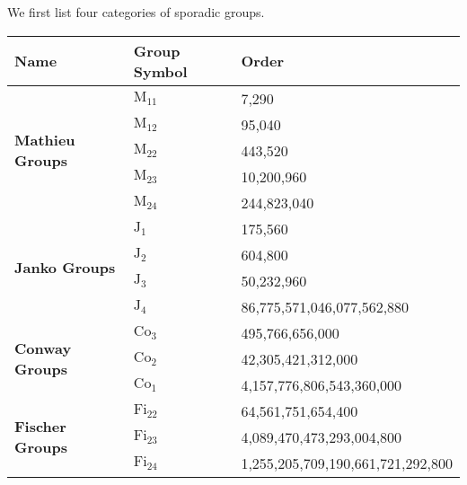 We first list four categories of sporadic groups.
\begin{table}[h]
    \centering
    \begin{tabular}{|l|l|l|}
        \hline
        \textbf{Name} & \textbf{Group Symbol} & \textbf{Order} \\ \hline
        \multirow{5}{*}{\textbf{Mathieu Groups}\index{Mathieu groups}} & $\mathrm{M}_{11}$ & 7,290 \\ \cline{2-3} 
        & $\mathrm{M}_{12}$ & 95,040 \\ \cline{2-3} 
        & $\mathrm{M}_{22}$ & 443,520 \\ \cline{2-3} 
        & $\mathrm{M}_{23}$ & 10,200,960 \\ \cline{2-3} 
        & $\mathrm{M}_{24}$ & 244,823,040 \\ \hline
        \multirow{4}{*}{\textbf{Janko Groups}\index{Janko groups}} & $\mathrm{J}_1$ & 175,560 \\ \cline{2-3} 
        & $\mathrm{J}_2$ & 604,800 \\ \cline{2-3} 
        & $\mathrm{J}_3$ & 50,232,960 \\ \cline{2-3} 
        & $\mathrm{J}_4$ & 86,775,571,046,077,562,880 \\ \hline
        \multirow{3}{*}{\textbf{Conway Groups}\index{Conway groups}} & $\mathrm{Co}_3$ & 495,766,656,000 \\ \cline{2-3} 
        & $\mathrm{Co}_2$ & 42,305,421,312,000 \\ \cline{2-3} 
        & $\mathrm{Co}_1$ & 4,157,776,806,543,360,000 \\ \hline
        \multirow{3}{*}{\textbf{Fischer Groups}\index{Fischer groups}} & $\mathrm{Fi}_{22}$ & 64,561,751,654,400 \\ \cline{2-3} 
        & $\mathrm{Fi}_{23}$ & 4,089,470,473,293,004,800 \\ \cline{2-3} 
        & $\mathrm{Fi}_{24}$ & 1,255,205,709,190,661,721,292,800 \\ \hline
    \end{tabular}
\end{table}

\newpage


